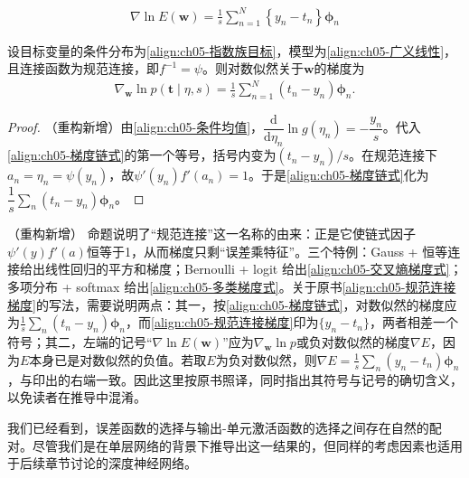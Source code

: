 \documentclass[../../main.tex]{subfiles}
\begin{document}
\begin{align}
  \nabla\ln E(\boldsymbol{w})=\frac{1}{s}\sum_{n=1}^{N}\left\{y_n-t_n\right\}\boldsymbol{\phi}_n
  \label{align:ch05-规范连接梯度}
\end{align}

\begin{proposition}[规范连接下的梯度化简]\label{proposition:ch05-规范连接梯度}
设目标变量的条件分布为\eqref{align:ch05-指数族目标}，模型为\eqref{align:ch05-广义线性}，且连接函数为规范连接，即$f^{-1}=\psi$。则对数似然关于$\boldsymbol{w}$的梯度为
\begin{align}
  \nabla_{\boldsymbol{w}}\ln p(\boldsymbol{t}\mid\eta,s)=\frac{1}{s}\sum_{n=1}^{N}\left(t_n-y_n\right)\boldsymbol{\phi}_n.
\end{align}
\end{proposition}

\begin{proof}
（重构新增）由\eqref{align:ch05-条件均值}，$\dfrac{\mathrm{d}}{\mathrm{d}\eta_n}\ln g(\eta_n)=-\dfrac{y_n}{s}$。代入\eqref{align:ch05-梯度链式}的第一个等号，括号内变为$(t_n-y_n)/s$。在规范连接下$a_n=\eta_n=\psi(y_n)$，故$\psi'(y_n)f'(a_n)=1$。于是\eqref{align:ch05-梯度链式}化为$\dfrac{1}{s}\sum_n(t_n-y_n)\boldsymbol{\phi}_n$。
\end{proof}

\begin{remark}（重构新增）
命题说明了“规范连接”这一名称的由来：正是它使链式因子$\psi'(y)f'(a)$恒等于1，从而梯度只剩“误差乘特征”。三个特例：Gauss + 恒等连接给出线性回归的平方和梯度；Bernoulli + logit 给出\eqref{align:ch05-交叉熵梯度式}；多项分布 + softmax 给出\eqref{align:ch05-多类梯度式}。关于原书\eqref{align:ch05-规范连接梯度}的写法，需要说明两点：其一，按\eqref{align:ch05-梯度链式}，对数似然的梯度应为$\frac{1}{s}\sum_n(t_n-y_n)\boldsymbol{\phi}_n$，而\eqref{align:ch05-规范连接梯度}印为$\{y_n-t_n\}$，两者相差一个符号；其二，左端的记号“$\nabla\ln E(\boldsymbol{w})$”应为$\nabla_{\boldsymbol{w}}\ln p$或负对数似然的梯度$\nabla E$，因为$E$本身已是对数似然的负值。若取$E$为负对数似然，则$\nabla E=\frac{1}{s}\sum_n(y_n-t_n)\boldsymbol{\phi}_n$，与印出的右端一致。因此这里按原书照译，同时指出其符号与记号的确切含义，以免读者在推导中混淆。
\end{remark}

我们已经看到，误差函数的选择与输出-单元激活函数的选择之间存在自然的配对。尽管我们是在单层网络的背景下推导出这一结果的，但同样的考虑因素也适用于后续章节讨论的深度神经网络。
\end{document}
